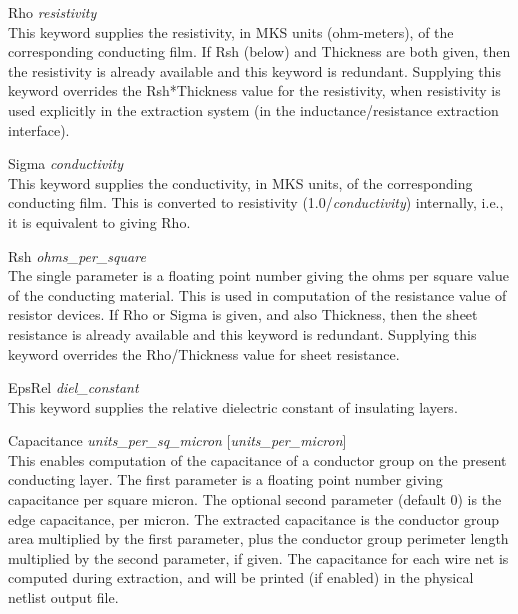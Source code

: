 \begin{description}
\item{\et Rho {\it resistivity}}\\
This keyword supplies the resistivity, in MKS units (ohm-meters), of
the corresponding conducting film.  If {\et Rsh} (below) and {\et
Thickness} are both given, then the resistivity is already available
and this keyword is redundant.  Supplying this keyword overrides the
{\et Rsh}*{\et Thickness} value for the resistivity, when resistivity
is used explicitly in the extraction system (in the
inductance/resistance extraction interface).

\item{\et Sigma {\it conductivity}}\\
This keyword supplies the conductivity, in MKS units, of the
corresponding conducting film.  This is converted to resistivity
(1.0/{\it conductivity\/}) internally, i.e., it is equivalent to
giving {\et Rho}.

\item{\et Rsh {\it ohms\_per\_square}}\\
The single parameter is a floating point number giving the ohms per
square value of the conducting material.  This is used in computation
of the resistance value of resistor devices.  If {\et Rho} or {\et
Sigma} is given, and also {\et Thickness}, then the sheet resistance
is already available and this keyword is redundant.  Supplying this
keyword overrides the {\et Rho}/{\et Thickness} value for sheet
resistance.

\item{\et EpsRel {\it diel\_constant}}\\
This keyword supplies the relative dielectric constant of insulating
layers.

\item{\et Capacitance {\it units\_per\_sq\_micron}
     [{\it units\_per\_micron}]}\\
This enables computation of the capacitance of a conductor group on
the present conducting layer.  The first parameter is a floating point
number giving capacitance per square micron.  The optional second
parameter (default 0) is the edge capacitance, per micron.  The
extracted capacitance is the conductor group area multiplied by the
first parameter, plus the conductor group perimeter length multiplied
by the second parameter, if given.  The capacitance for each wire net
is computed during extraction, and will be printed (if enabled) in the
physical netlist output file.


\end{description}
